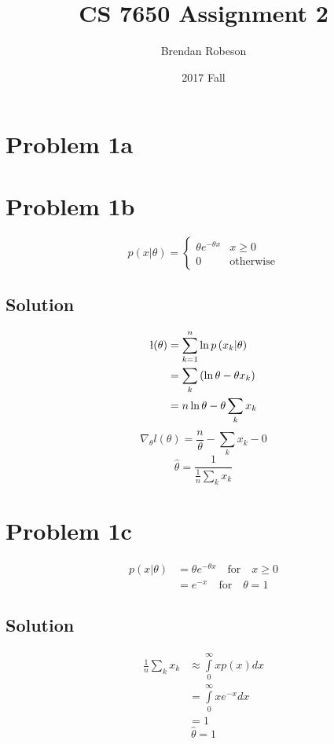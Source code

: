 \documentclass{IEEEtran}
\title{CS 7650 Assignment 2}
\author{Brendan Robeson}
\date{2017 Fall}
\begin{document}
\maketitle

\section{Problem 1a}

\newpage

\section{Problem 1b}
\[p(x|\theta) = \begin{cases}
    \theta e^{-\theta x} & x \ge 0 \\
    0 & \text{otherwise}
\end{cases}\]
\subsection{Solution}
\begin{align*}
    \l(\theta) &= \sum_{k=1}^n \ln p\left(x_k|\theta\right) \\
    &= \sum_k \left(\ln \theta - \theta x_k\right) \\
    &= n \ln \theta - \theta \sum_k x_k
\end{align*}
\[\nabla_\theta l(\theta) = \frac{n}{\theta} - \sum_k x_k - 0\]
\[\hat{\theta} = \frac{1}{\frac{1}{n} \sum_k x_k}\]

\newpage

\section{Problem 1c}
\begin{align*}
    p(x|\theta) &= \theta e^{-\theta x} \quad\text{for}\quad x \ge 0 \\
    &= e^{-x} \quad\text{for}\quad \theta = 1
\end{align*}
\subsection{Solution}
\begin{align*}
    \frac{1}{n} \sum_k x_k &\approx \int\limits_0^\infty xp(x)dx \\
    &= \int\limits_0^\infty xe^{-x}dx \\
    &= 1
\end{align*}
\[\hat{\theta} = 1\]
\end{document}

